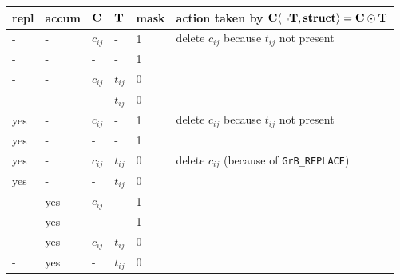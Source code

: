 \begin{table}
{\small
\begin{tabular}{lllll|l}
\hline
repl & accum & ${\bf C}$ & ${\bf T}$ & mask & action taken by
${\bf C \langle \lnot T, struct \rangle = C \odot T}$ \\
\hline
    -  &-   & $c_{ij}$ &  -        & 1    &  delete $c_{ij}$ because $t_{ij}$ not present \\
    -  &-   &  -       &  -        & 1    &   \\
    -  &-   & $c_{ij}$ & $t_{ij}$  & 0    &   \\
    -  &-   &  -       & $t_{ij}$  & 0    &   \\
\hline
    yes&-   & $c_{ij}$ &  -        & 1    &  delete $c_{ij}$ because $t_{ij}$ not present \\
    yes&-   &  -       &  -        & 1    &   \\
    yes&-   & $c_{ij}$ & $t_{ij}$  & 0    &  delete $c_{ij}$  (because of \verb'GrB_REPLACE') \\
    yes&-   &  -       & $t_{ij}$  & 0    &   \\
\hline
    -  &yes & $c_{ij}$ &  -        & 1    &   \\
    -  &yes &  -       &  -        & 1    &   \\
    -  &yes & $c_{ij}$ & $t_{ij}$  & 0    &   \\
    -  &yes &  -       & $t_{ij}$  & 0    &   \\

\end{tabular}}
\end{table}
